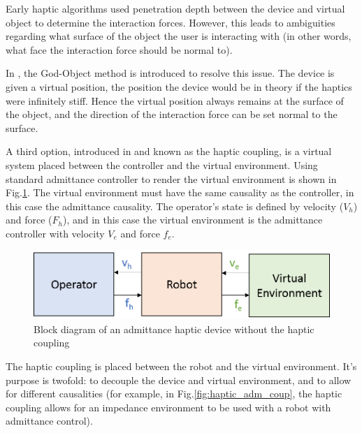 \documentclass[12pt]{report}
\begin{document}
	
		
	
		Early haptic algorithms used penetration depth between the device and virtual object to determine the interaction forces. However, this leads to ambiguities regarding what surface of the object the user is interacting with (in other words, what face the interaction force should be normal to). 
		
		In \cite{Zilles}, the God-Object method is introduced to resolve this issue. The device is given a virtual position, the position the device would be in theory if the haptics were infinitely stiff. Hence the virtual position always remains at the surface of the object, and the direction of the interaction force can be set normal to the surface. 
		
		A third option, introduced in \cite{Adams1999} and known as the haptic coupling, is a virtual system placed between the controller and the virtual environment. Using standard admittance controller to render the virtual environment is shown in Fig.\ref{fig:haptic_adm}. The virtual environment must have the same causality as the controller, in this case the admittance causality. The operator's state is defined by velocity ($V_h$) and force ($F_h$), and in this case the virtual environment is the admittance controller with velocity $V_e$ and force $f_e$. 
	
	\begin{figure}[h] 
		\centering
		\includegraphics[width=0.75\linewidth]{haptics_admittance}
		\caption{Block diagram of an admittance haptic device without the haptic coupling}
		\label{fig:haptic_adm}
	\end{figure}	
	
	The haptic coupling is placed between the robot and the virtual environment. It's purpose is twofold: to decouple the device and virtual environment, and to allow for different causalities (for example, in Fig.\ref{fig:haptic_adm_coup}, the haptic coupling allows for an impedance environment to be used with a robot with admittance control).
	
\end{document}
